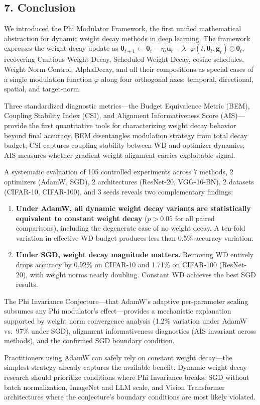 \documentclass[
]{article}
\begin{document}
\hypertarget{conclusion}{%
\subsection{7. Conclusion}\label{conclusion}}

We introduced the Phi Modulator Framework, the first unified
mathematical abstraction for dynamic weight decay methods in deep
learning. The framework expresses the weight decay update as
\(\boldsymbol{\theta}_{t+1} \leftarrow \boldsymbol{\theta}_t - \eta_t \mathbf{u}_t - \lambda \cdot \varphi(t, \boldsymbol{\theta}_t, \mathbf{g}_t) \odot \boldsymbol{\theta}_t\),
recovering Cautious Weight Decay, Scheduled Weight Decay, cosine
schedules, Weight Norm Control, AlphaDecay, and all their compositions
as special cases of a single modulation function \(\varphi\) along four
orthogonal axes: temporal, directional, spatial, and target-norm.

Three standardized diagnostic metrics---the Budget Equivalence Metric
(BEM), Coupling Stability Index (CSI), and Alignment Informativeness
Score (AIS)---provide the first quantitative tools for characterizing
weight decay behavior beyond final accuracy. BEM disentangles modulation
strategy from total decay budget; CSI captures coupling stability
between WD and optimizer dynamics; AIS measures whether gradient-weight
alignment carries exploitable signal.

A systematic evaluation of 105 controlled experiments across 7 methods,
2 optimizers (AdamW, SGD), 2 architectures (ResNet-20, VGG-16-BN), 2
datasets (CIFAR-10, CIFAR-100), and 3 seeds reveals two complementary
findings:

\begin{enumerate}
\def\labelenumi{\arabic{enumi}.}
\item
  \textbf{Under AdamW, all dynamic weight decay variants are
  statistically equivalent to constant weight decay} (\(p > 0.05\) for
  all paired comparisons), including the degenerate case of no weight
  decay. A ten-fold variation in effective WD budget produces less than
  0.5\% accuracy variation.
\item
  \textbf{Under SGD, weight decay magnitude matters.} Removing WD
  entirely drops accuracy by 0.92\% on CIFAR-10 and 1.71\% on CIFAR-100
  (ResNet-20), with weight norms nearly doubling. Constant WD achieves
  the best SGD results.
\end{enumerate}

The Phi Invariance Conjecture---that AdamW's adaptive per-parameter
scaling subsumes any Phi modulator's effect---provides a mechanistic
explanation supported by weight norm convergence analysis (1.2\%
variation under AdamW vs.~97\% under SGD), alignment informativeness
diagnostics (AIS invariant across methods), and the confirmed SGD
boundary condition.

Practitioners using AdamW can safely rely on constant weight decay---the
simplest strategy already captures the available benefit. Dynamic weight
decay research should prioritize conditions where Phi Invariance breaks:
SGD without batch normalization, ImageNet and LLM scale, and Vision
Transformer architectures where the conjecture's boundary conditions are
most likely violated.
\end{document}
